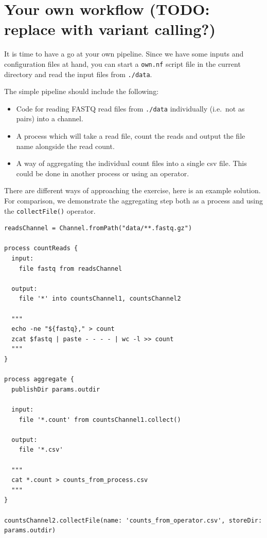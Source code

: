 \section{Your own workflow (TODO: replace with variant calling?)}

It is time to have a go at your own pipeline. 
Since we have some inputs and configuration files at hand, 
you can start a \texttt{own.nf} script file in the current 
directory and read the input files from \texttt{./data}. 



\begin{questions}
The simple pipeline should include the following:

\begin{itemize}
\item Code for reading FASTQ read files from \texttt{./data} individually (i.e.\ not as pairs) into a channel.
\item A process which will take a read file, count the reads and output the file name alongside the read count.
\item A way of aggregating the individual count files into a single csv file. This could be done in another process or using an operator. 
\end{itemize}

\begin{answer}

There are different ways of approaching the exercise, 
here is an example solution.
For comparison, we demonstrate the aggregating step both as a process
and using the \texttt{collectFile()} operator. 

\begin{lstlisting}
readsChannel = Channel.fromPath("data/**.fastq.gz") 

process countReads {
  input:
    file fastq from readsChannel

  output:
    file '*' into countsChannel1, countsChannel2

  """
  echo -ne "${fastq}," > count
  zcat $fastq | paste - - - - | wc -l >> count
  """
}

process aggregate {
  publishDir params.outdir

  input:
    file '*.count' from countsChannel1.collect()

  output:
    file '*.csv'

  """
  cat *.count > counts_from_process.csv
  """
}

countsChannel2.collectFile(name: 'counts_from_operator.csv', storeDir: params.outdir)
\end{lstlisting}
\end{answer}

\end{questions}
